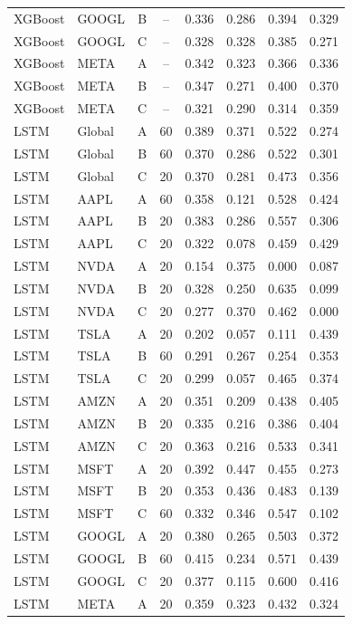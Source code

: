 \documentclass[10pt]{article}
\begin{document}
{\begin{longtable}{@{}l l c c c c c c@{}}
XGBoost & GOOGL & B & -- & 0.336 & 0.286 & 0.394 & 0.329 \\
XGBoost & GOOGL & C & -- & 0.328 & 0.328 & 0.385 & 0.271 \\
XGBoost & META & A & -- & 0.342 & 0.323 & 0.366 & 0.336 \\
XGBoost & META & B & -- & 0.347 & 0.271 & 0.400 & 0.370 \\
XGBoost & META & C & -- & 0.321 & 0.290 & 0.314 & 0.359 \\
\midrule
LSTM & Global & A & 60 & 0.389 & 0.371 & 0.522 & 0.274 \\
LSTM & Global & B & 60 & 0.370 & 0.286 & 0.522 & 0.301 \\
LSTM & Global & C & 20 & 0.370 & 0.281 & 0.473 & 0.356 \\
LSTM & AAPL & A & 60 & 0.358 & 0.121 & 0.528 & 0.424 \\
LSTM & AAPL & B & 20 & 0.383 & 0.286 & 0.557 & 0.306 \\
LSTM & AAPL & C & 20 & 0.322 & 0.078 & 0.459 & 0.429 \\
LSTM & NVDA & A & 20 & 0.154 & 0.375 & 0.000 & 0.087 \\
LSTM & NVDA & B & 20 & 0.328 & 0.250 & 0.635 & 0.099 \\
LSTM & NVDA & C & 20 & 0.277 & 0.370 & 0.462 & 0.000 \\
LSTM & TSLA & A & 20 & 0.202 & 0.057 & 0.111 & 0.439 \\
LSTM & TSLA & B & 60 & 0.291 & 0.267 & 0.254 & 0.353 \\
LSTM & TSLA & C & 20 & 0.299 & 0.057 & 0.465 & 0.374 \\
LSTM & AMZN & A & 20 & 0.351 & 0.209 & 0.438 & 0.405 \\
LSTM & AMZN & B & 20 & 0.335 & 0.216 & 0.386 & 0.404 \\
LSTM & AMZN & C & 20 & 0.363 & 0.216 & 0.533 & 0.341 \\
LSTM & MSFT & A & 20 & 0.392 & 0.447 & 0.455 & 0.273 \\
LSTM & MSFT & B & 20 & 0.353 & 0.436 & 0.483 & 0.139 \\
LSTM & MSFT & C & 60 & 0.332 & 0.346 & 0.547 & 0.102 \\
LSTM & GOOGL & A & 20 & 0.380 & 0.265 & 0.503 & 0.372 \\
LSTM & GOOGL & B & 60 & 0.415 & 0.234 & 0.571 & 0.439 \\
LSTM & GOOGL & C & 20 & 0.377 & 0.115 & 0.600 & 0.416 \\
LSTM & META & A & 20 & 0.359 & 0.323 & 0.432 & 0.324 \\

\end{longtable}}
\end{document}

